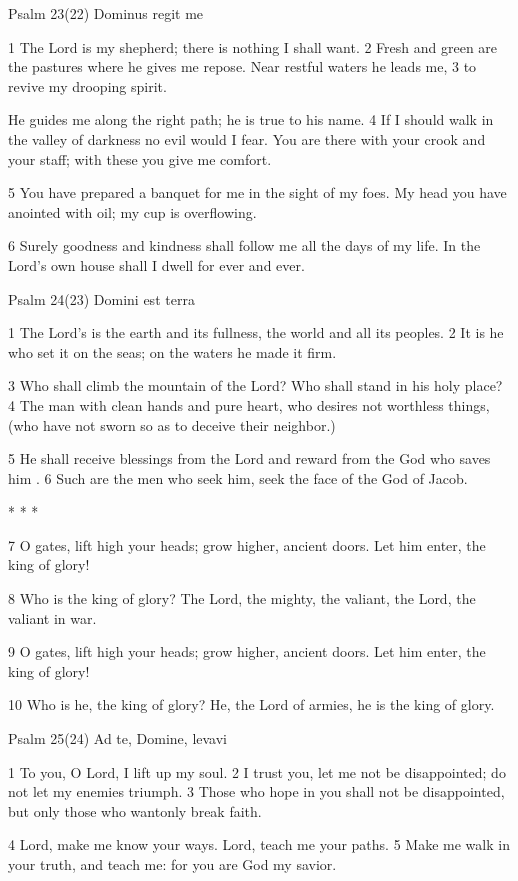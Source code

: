 Psalm 23(22) Dominus regit me

1 The Lord is my shepherd;
there is nothing I shall want.
2 Fresh and green are the pastures
where he gives me repose.
Near restful waters he leads me,
3 to revive my drooping spirit.

He guides me along the right path;
he is true to his name.
4 If I should walk in the valley of darkness
no evil would I fear.
You are there with your crook and your staff;
with these you give me comfort.

5 You have prepared a banquet for me
in the sight of my foes.
My head you have anointed with oil;
my cup is overflowing.

6 Surely goodness and kindness shall follow me
all the days of my life.
In the Lord's own house shall I dwell
for ever and ever.


Psalm 24(23) Domini est terra

1 The Lord's is the earth and its fullness,
the world and all its peoples.
2 It is he who set it on the seas;
on the waters he made it firm.

3 Who shall climb the mountain of the Lord?
Who shall stand in his holy place?
4 The man with clean hands and pure heart,
who desires not worthless things,
(who have not sworn so as to deceive their neighbor.)

5 He shall receive blessings from the Lord
and reward from the God who saves him .
6 Such are the men who seek him,
seek the face of the God of Jacob.

* * *

7 O gates, lift high your heads;
grow higher, ancient doors.
Let him enter, the king of glory!

8 Who is the king of glory?
The Lord, the mighty, the valiant,
the Lord, the valiant in war.

9 O gates, lift high your heads;
grow higher, ancient doors.
Let him enter, the king of glory!

10 Who is he, the king of glory?
He, the Lord of armies,
he is the king of glory.



Psalm 25(24) Ad te, Domine, levavi

1 To you, O Lord, I lift up my soul.
2 I trust you, let me not be disappointed;
do not let my enemies triumph.
3 Those who hope in you shall not be disappointed,
but only those who wantonly break faith.

4 Lord, make me know your ways.
Lord, teach me your paths.
5 Make me walk in your truth, and teach me:
for you are God my savior.

